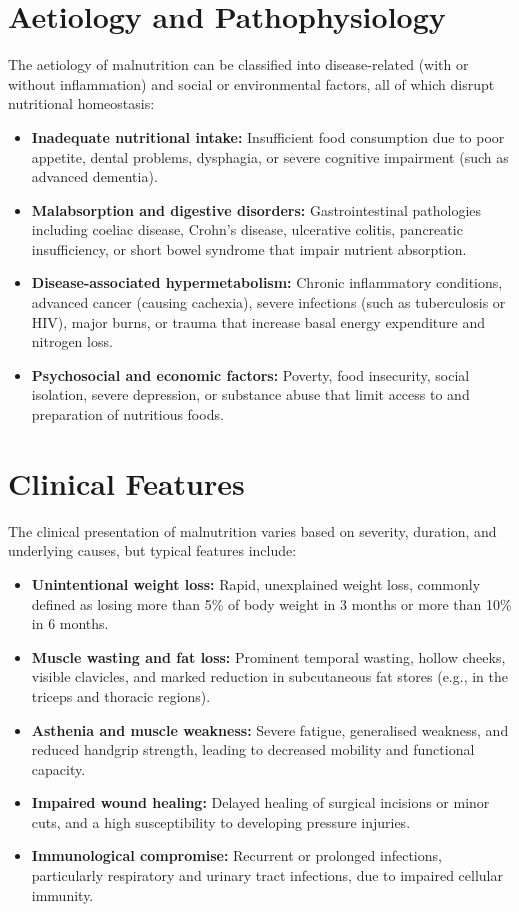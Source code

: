\section*{Aetiology and Pathophysiology}
The aetiology of malnutrition can be classified into disease-related (with or without inflammation) and social or environmental factors, all of which disrupt nutritional homeostasis:
\begin{itemize}
    \item \textbf{Inadequate nutritional intake:} Insufficient food consumption due to poor appetite, dental problems, dysphagia, or severe cognitive impairment (such as advanced dementia).
    \item \textbf{Malabsorption and digestive disorders:} Gastrointestinal pathologies including coeliac disease, Crohn's disease, ulcerative colitis, pancreatic insufficiency, or short bowel syndrome that impair nutrient absorption.
    \item \textbf{Disease-associated hypermetabolism:} Chronic inflammatory conditions, advanced cancer (causing cachexia), severe infections (such as tuberculosis or HIV), major burns, or trauma that increase basal energy expenditure and nitrogen loss.
    \item \textbf{Psychosocial and economic factors:} Poverty, food insecurity, social isolation, severe depression, or substance abuse that limit access to and preparation of nutritious foods.
\end{itemize}

\section*{Clinical Features}
The clinical presentation of malnutrition varies based on severity, duration, and underlying causes, but typical features include:
\begin{itemize}
    \item \textbf{Unintentional weight loss:} Rapid, unexplained weight loss, commonly defined as losing more than 5\% of body weight in 3 months or more than 10\% in 6 months.
    \item \textbf{Muscle wasting and fat loss:} Prominent temporal wasting, hollow cheeks, visible clavicles, and marked reduction in subcutaneous fat stores (e.g., in the triceps and thoracic regions).
    \item \textbf{Asthenia and muscle weakness:} Severe fatigue, generalised weakness, and reduced handgrip strength, leading to decreased mobility and functional capacity.
    \item \textbf{Impaired wound healing:} Delayed healing of surgical incisions or minor cuts, and a high susceptibility to developing pressure injuries.
    \item \textbf{Immunological compromise:} Recurrent or prolonged infections, particularly respiratory and urinary tract infections, due to impaired cellular immunity.
\end{itemize}

